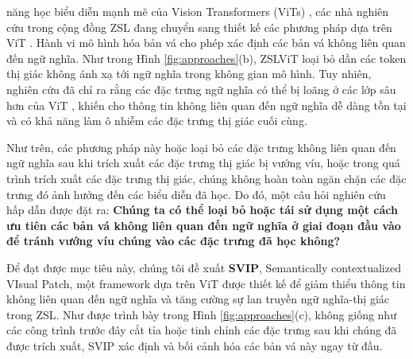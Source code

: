 năng học biểu diễn mạnh mẽ của Vision Transformers (ViTs) \cite{19, 66}, các nhà nghiên cứu trong cộng đồng ZSL đang chuyển sang thiết kế các phương pháp dựa trên ViT \cite{4, 17, 32}. Hành vi mô hình hóa bản vá cho phép xác định các bản vá không liên quan đến ngữ nghĩa. Như trong Hình \ref{fig:approaches}(b), ZSLViT \cite{4} loại bỏ dần các token thị giác không ánh xạ tới ngữ nghĩa trong không gian mô hình. Tuy nhiên, nghiên cứu đã chỉ ra rằng các đặc trưng ngữ nghĩa có thể bị loãng ở các lớp sâu hơn của ViT \cite{40}, khiến cho thông tin không liên quan đến ngữ nghĩa dễ dàng tồn tại và có khả năng làm ô nhiễm các đặc trưng thị giác cuối cùng.


Như trên, các phương pháp này hoặc loại bỏ các đặc trưng không liên quan đến ngữ nghĩa sau khi trích xuất các đặc trưng thị giác bị vướng víu, hoặc trong quá trình trích xuất các đặc trưng thị giác, chúng không hoàn toàn ngăn chặn các đặc trưng đó ảnh hưởng đến các biểu diễn đã học. Do đó, một câu hỏi nghiên cứu hấp dẫn được đặt ra: \textbf{Chúng ta có thể loại bỏ hoặc tái sử dụng một cách ưu tiên các bản vá không liên quan đến ngữ nghĩa ở giai đoạn đầu vào để tránh vướng víu chúng vào các đặc trưng đã học không?}

Để đạt được mục tiêu này, chúng tôi đề xuất \textbf{SVIP}, Semantically contextualized VIsual Patch, một framework dựa trên ViT được thiết kế để giảm thiểu thông tin không liên quan đến ngữ nghĩa và tăng cường sự lan truyền ngữ nghĩa-thị giác trong ZSL. Như được trình bày trong Hình \ref{fig:approaches}(c), không giống như các công trình trước đây cắt tỉa hoặc tinh chỉnh các đặc trưng sau khi chúng đã được trích xuất, SVIP xác định và bối cảnh hóa các bản vá này ngay từ đầu.

